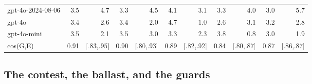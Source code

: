 \documentclass{article}
\begin{document}
\begin{table}[H]
\begin{center}
{\begin{tabular}{@{}lrrrrrrrrrr@{}}
gpt-4o-2024-08-06 &\cellcolor[HTML]{8DD3BA}\textcolor[HTML]{1A1A1A}{3.5}&\cellcolor[HTML]{50BCC2}\textcolor[HTML]{1A1A1A}{4.7}&\cellcolor[HTML]{99D7B8}\textcolor[HTML]{1A1A1A}{3.3}&\cellcolor[HTML]{5ABFC0}\textcolor[HTML]{1A1A1A}{4.5}&\cellcolor[HTML]{6EC7BE}\textcolor[HTML]{1A1A1A}{4.1}&\cellcolor[HTML]{A4DCB7}\textcolor[HTML]{1A1A1A}{3.1}&\cellcolor[HTML]{99D7B8}\textcolor[HTML]{1A1A1A}{3.3}&\cellcolor[HTML]{73C8BD}\textcolor[HTML]{1A1A1A}{4.0}&\cellcolor[HTML]{AADEB7}\textcolor[HTML]{1A1A1A}{3.0}&\cellcolor[HTML]{2DA1C2}\textcolor[HTML]{EEF3F8}{5.7} \\
gpt-4o &\cellcolor[HTML]{93D5B9}\textcolor[HTML]{1A1A1A}{3.4}&\cellcolor[HTML]{C1E7B5}\textcolor[HTML]{1A1A1A}{2.6}&\cellcolor[HTML]{93D5B9}\textcolor[HTML]{1A1A1A}{3.4}&\cellcolor[HTML]{D6EFB3}\textcolor[HTML]{1A1A1A}{2.0}&\cellcolor[HTML]{50BCC2}\textcolor[HTML]{1A1A1A}{4.7}&\cellcolor[HTML]{F1F9B9}\textcolor[HTML]{1A1A1A}{1.0}&\cellcolor[HTML]{C1E7B5}\textcolor[HTML]{1A1A1A}{2.6}&\cellcolor[HTML]{A4DCB7}\textcolor[HTML]{1A1A1A}{3.1}&\cellcolor[HTML]{9FD9B8}\textcolor[HTML]{1A1A1A}{3.2}&\cellcolor[HTML]{B6E2B6}\textcolor[HTML]{1A1A1A}{2.8} \\
gpt-4o-mini &\cellcolor[HTML]{8DD3BA}\textcolor[HTML]{1A1A1A}{3.5}&\cellcolor[HTML]{D3EEB3}\textcolor[HTML]{1A1A1A}{2.1}&\cellcolor[HTML]{8DD3BA}\textcolor[HTML]{1A1A1A}{3.5}&\cellcolor[HTML]{AADEB7}\textcolor[HTML]{1A1A1A}{3.0}&\cellcolor[HTML]{99D7B8}\textcolor[HTML]{1A1A1A}{3.3}&\cellcolor[HTML]{CDEBB4}\textcolor[HTML]{1A1A1A}{2.3}&\cellcolor[HTML]{7DCCBB}\textcolor[HTML]{1A1A1A}{3.8}&\cellcolor[HTML]{F3FBBF}\textcolor[HTML]{1A1A1A}{0.8}&\cellcolor[HTML]{AADEB7}\textcolor[HTML]{1A1A1A}{3.0}&\cellcolor[HTML]{D9F0B3}\textcolor[HTML]{1A1A1A}{1.9} \\
cos(G,E) &\cellcolor[HTML]{F2FABC}\textcolor[HTML]{1A1A1A}{0.91}& {[}.83,.95{]} &\cellcolor[HTML]{F2FABC}\textcolor[HTML]{1A1A1A}{0.90}& {[}.80,.93{]} &\cellcolor[HTML]{F2FABD}\textcolor[HTML]{1A1A1A}{0.89}& {[}.82,.92{]} &\cellcolor[HTML]{F3FABE}\textcolor[HTML]{1A1A1A}{0.84}& {[}.80,.87{]} &\cellcolor[HTML]{F2FABD}\textcolor[HTML]{1A1A1A}{0.87}& {[}.86,.87{]}  \\
\bottomrule
\end{tabular}}
\end{center}
\end{table}

\subsection{The contest, the ballast, and the guards}\label{the-contest-the-ballast-and-the-guards}
\end{document}

